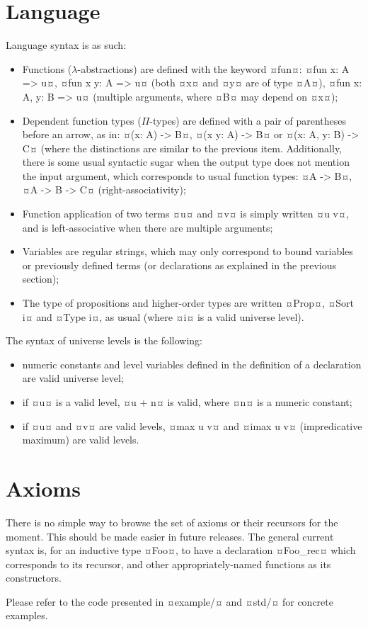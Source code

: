 \documentclass[twocolumn]{article}
\begin{document}
\section{Language}
Language syntax is as such:
\begin{itemize}
	\item Functions (\(\lambda\)-abstractions) are defined with the keyword ¤fun¤:
		¤fun x: A => u¤, ¤fun x y: A => u¤ (both ¤x¤ and ¤y¤ are of type ¤A¤),
		¤fun x: A, y: B => u¤ (multiple arguments, where ¤B¤ may depend on ¤x¤);

	\item Dependent function types (\(\Pi\)-types) are defined with a pair of parentheses
		before an arrow, as in: ¤(x: A) -> B¤, ¤(x y: A) -> B¤ or
		¤(x: A, y: B) -> C¤ (where the distinctions are similar to the previous
		item. Additionally, there is some usual syntactic sugar when the output
		type does not mention the input argument, which corresponds to usual
		function types: ¤A -> B¤, ¤A -> B -> C¤ (right-associativity);

	\item Function application of two terms ¤u¤ and ¤v¤ is simply written ¤u v¤,
		and is left-associative when there are multiple arguments;

	\item Variables are regular strings, which may only correspond to bound
		variables or previously defined terms (or declarations as explained in the
		previous section);

	\item The type of propositions and higher-order types are written ¤Prop¤,
		¤Sort i¤ and ¤Type i¤, as usual (where ¤i¤ is a valid universe level).
\end{itemize}

The syntax of universe levels is the following:
\begin{itemize}
	\item numeric constants and level variables defined in the definition of a
		declaration are valid universe level;
	\item if ¤u¤ is a valid level, ¤u + n¤ is valid, where ¤n¤ is a numeric
		constant;
	\item if ¤u¤ and ¤v¤ are valid levels, ¤max u v¤ and ¤imax u v¤ (impredicative
		maximum) are valid levels.
\end{itemize}

\section{Axioms}
There is no simple way to browse the set of axioms or their recursors for the
moment. This should be made easier in future releases. The general current
syntax is, for an inductive type ¤Foo¤, to have a declaration ¤Foo_rec¤ which
corresponds to its recursor, and other appropriately-named functions as its
constructors.

Please refer to the code presented in ¤example/¤ and ¤std/¤ for concrete
examples.
\end{document}
